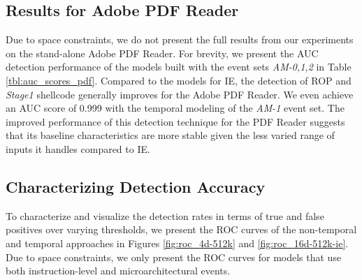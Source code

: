 \documentclass{acm_proc_article-sp}
\begin{document}
	\fi 


\subsection{Results for Adobe PDF Reader}
Due to space constraints, we do not present the full results from our
experiments on the stand-alone Adobe PDF Reader. For brevity, we 
present the AUC detection performance of the models built with the 
event sets \textit{AM-0,1,2} in Table \ref{tbl:auc_scores_pdf}. 
Compared to the models for IE, the detection of ROP and \textit{Stage1} 
shellcode generally improves for the Adobe PDF Reader. We even achieve 
an AUC score of 0.999 with the temporal modeling of the \textit{AM-1} 
event set.  The improved performance of this detection technique for 
the PDF Reader suggests that its baseline characteristics are more 
stable given the less varied range of inputs it handles compared to IE.


\begin{table}
\caption{AUC scores for stand-alone Adobe PDF Reader.}
\label{tbl:auc_scores_pdf}
\end{table}



\iffalse
	\subsection{Characterizing Detection Accuracy}
	To characterize and visualize the detection rates in terms of true and false positives over varying thresholds, we present the ROC curves of the non-temporal and temporal approaches in Figures \ref{fig:roc_4d-512k} and \ref{fig:roc_16d-512k-ie}. Due to space constraints, we only present the ROC curves for models that use both instruction-level and microarchitectural events.
	
\end{document}
